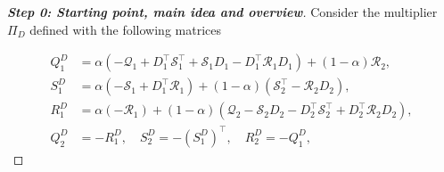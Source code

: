 \documentclass[11pt,a4paper,oneside,DIV=12,headings=small]{scrartcl}
\newcommand{\cS}{\mathcal{S}}
\newcommand{\cQ}{\mathcal{Q}}
\newcommand{\cR}{\mathcal{R}}
\theoremstyle{plain}
\begin{document}
\begin{proof}[\textbf{Step 0: \emph{Starting point, main idea and overview}}]
%
%
Consider the multiplier $\Pi_D$ defined with the following matrices

\begin{subequations}
\label{MultNew}
\begin{align}
Q^D_1&= \alpha ( -\cQ_1+D_1^\top \cS_1^\top+\cS_1 D_1-D_1^\top \cR_1 D_1 )+(1-\alpha)\cR_2, \label{MultA} \\
S^D_1&= \alpha(-\cS_1+D_1^\top \cR_1)+(1-\alpha)(\cS_2^\top-\cR_2 D_2), \label{MultB}\\
R^D_1&= \alpha (-\cR_1)+(1-\alpha)(\cQ_2-\cS_2 D_2-D_2^\top \cS_2^\top + D_2^\top \cR_2 D_2), \label{MultC}\\
Q^D_2&=-R^D_1, \quad S^D_2=-(S^D_1)^\top, \quad R^D_2=-Q^D_1,  \label{MultD}
\end{align}
\end{subequations}


\end{proof}
\end{document}
